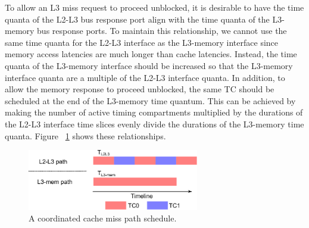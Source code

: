 To allow an L3 miss request to proceed unblocked, it is desirable to have the time 
quanta of the L2-L3 bus response port align with the time quanta of the 
L3-memory bus response ports. To maintain this relationship, we cannot use the 
same time quanta for the L2-L3 interface as the L3-memory interface since 
memory access latencies are much longer than cache latencies. Instead, the time 
quanta of the L3-memory interface should be increased so that the L3-memory 
interface quanta are a multiple of the L2-L3 interface quanta. 
In addition, to allow the memory response to proceed unblocked, the same TC 
should be scheduled at the end of the L3-memory time quantum. This can be 
achieved by making the number of active timing compartments multiplied by the 
durations of the L2-L3 interface time slices evenly divide the
durations of the L3-memory time quanta.
Figure 
~\ref{fig:coordination} shows these relationships.


\begin{figure}
    \begin{center}
        \includegraphics[width=2.9475in]{figs/coordination.eps}
        \caption{A coordinated cache miss path schedule.}
        \label{fig:coordination}
    \end{center}
\end{figure}

